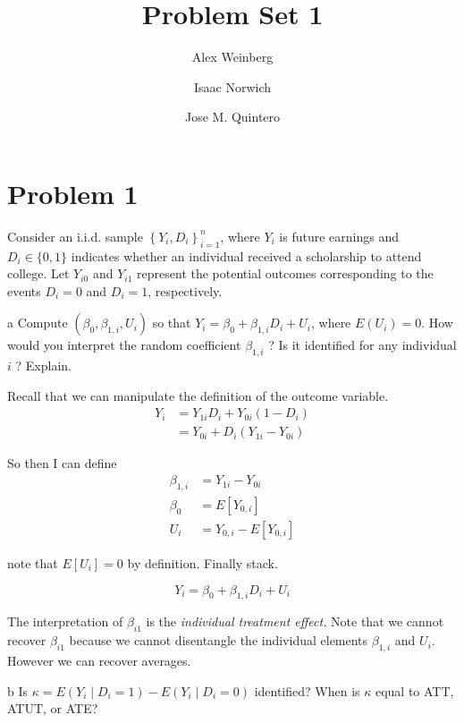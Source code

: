 \documentclass{article}
\title{Problem Set 1}
\author{Alex Weinberg \and Isaac Norwich \and Jose M. Quintero}
\begin{document}
\maketitle
\section*{Problem 1}
Consider an i.i.d. sample $\left\{Y_{i}, D_{i}\right\}_{i=1}^{n}$, where $Y_{i}$ is future earnings and $D_{i} \in\{0,1\}$ indicates whether an individual received a scholarship to attend college. Let $Y_{i 0}$ and $Y_{i 1}$ represent the potential outcomes corresponding to the events $D_{i}=0$ and $D_{i}=1$, respectively.

\begin{problem}{a}
 Compute $\left(\beta_{0}, \beta_{1, i}, U_{i}\right)$ so that $Y_{i}=\beta_{0}+\beta_{1, i} D_{i}+U_{i}$, where $E\left(U_{i}\right)=0$. How would you interpret the random coefficient $\beta_{1, i}$ ? Is it identified for any individual $i$ ? Explain. 
\end{problem}
\begin{solution}
Recall that we can manipulate the definition of the outcome variable.
\begin{align*}
Y_{i} & =Y_{1i}D_{i}+Y_{0i}\left(1-D_{i}\right)\\
 & =Y_{0i}+D_{i}\left(Y_{1i}-Y_{0i}\right)
\end{align*}

So then I can define
\begin{align*}
\beta_{1,i} & =Y_{1i}-Y_{0i}\\
\beta_{0} & =E\left[Y_{0,i}\right]\\
U_{i} & =Y_{0,i}-E\left[Y_{0,i}\right]
\end{align*}

note that $E\left[U_{i}\right]=0$ by definition. Finally stack.

\[
\ensuremath{Y_{i}=\beta_{0}+\beta_{1,i}D_{i}+U_{i}}
\]

The interpretation of $\beta_{i1}$ is the \emph{individual treatment
effect. }Note that we cannot recover $\beta_{i1}$ because we cannot
disentangle the individual elements $\beta_{1,i}$ and $U_{i}$. However
we can recover averages. 
\end{solution}
\begin{problem}{b}
Is $\kappa=E\left(Y_{i} \mid D_{i}=1\right)-E\left(Y_{i} \mid D_{i}=0\right)$ identified? When is $\kappa$ equal to ATT, ATUT, or ATE? \end{problem}
\end{document}
